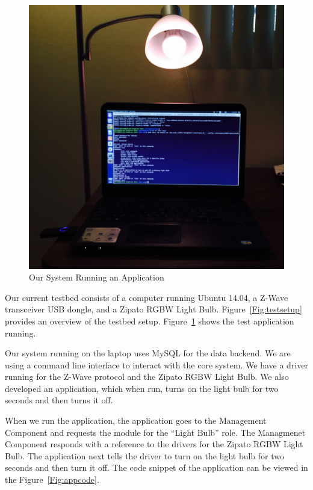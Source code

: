 \begin{figure}[tbh]                                                              
    \centering                                                                   
    \includegraphics[width=1.0\columnwidth]{figs/workingtest.jpg}                 
    \caption{Our System Running an Application}                                                       
    \label{Fig:runapp}                                                             
\end{figure} 
Our current testbed consists of a computer running Ubuntu 14.04, a Z-Wave
transceiver USB dongle, and a Zipato RGBW Light Bulb. Figure~\ref{Fig:testsetup}
provides an overview of the testbed setup. Figure~\ref{Fig:runapp} shows the
test application running.

Our system running on the laptop uses MySQL for the data backend. We are using
a command line interface to interact with the core system. We have a driver
running for the Z-Wave protocol and the Zipato RGBW Light Bulb. We also
developed an application, which when run, turns on the light bulb for two
seconds and then turns it off. 

When we run the application, the application goes to the Management Component
and requests the module for the ``Light Bulb'' role. The Managmenet Component
responds with a reference to the drivers for the Zipato RGBW Light Bulb. The
application next tells the driver to turn on the light bulb for two seconds and
then turn it off. The code snippet of the application can be viewed in the
Figure~\ref{Fig:appcode}.

